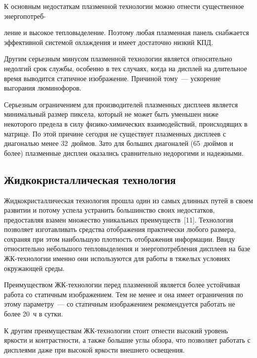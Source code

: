 \begin{multicols}{2}
     К основным недостаткам плазменной технологии можно отнести 
существенное энер\-го\-по\-треб-\linebreak\vspace*{-12pt}
\pagebreak

\noindent
ле\-ние и высокое тепловыделение. Поэтому любая 
плазменная панель снабжается эффективной системой охлаждения и имеет 
достаточно низкий КПД. 
     
     Другим серьезным минусом плазменной технологии является 
относительно недолгий срок службы, особенно в тех случаях, когда на 
дисплей на длительное время выводится статичное изображение. Причиной 
тому~--- ускорение выгорания люминофоров. 
     
     Серьезным ограничением для производителей плазменных дисплеев 
является минимальный размер пиксела, который не может быть уменьшен 
ниже некоторого предела в силу физико-химических взаимодействий, 
происходящих в матрице. По этой причине сегодня не существует 
плазменных дисплеев с диагональю менее 32~дюймов. Зато для больших 
диагоналей (65~дюймов и более) плазменные дисплеи оказались 
сравнительно недорогими и надежными.     

\subsection{Жидкокристаллическая технология} %

     Жидкокристаллическая технология прошла один из самых длинных 
путей в своем развитии и потому успела устранить большинство своих 
недостатков, предоставляя взамен множество уникальных преимуществ~[11]. 
Технология позволяет изготавливать средства отображения практически 
любого размера, сохраняя при этом наибольшую плотность отображения 
информации. Ввиду относительно небольшого тепловыделения и 
энер\-го\-по\-треб\-ле\-ния дисплеев на базе ЖК-тех\-но\-ло\-гии именно они 
используются для работы в тяжелых условиях окружающей среды. 
     
     Преимуществом ЖК-технологии перед плазменной является более 
устойчивая работа со статичным изображением. Тем не менее и она имеет 
ограничения по этому параметру~--- со статичным изображением 
рекомендуется работать не более 20~ч в сутки. 
     
     К другим преимуществам ЖК-технологии стоит отнести высокий 
уровень яркости и контраст\-ности, а также большие углы обзора, что 
позволяет работать с дисплеями даже при высокой яркости внешнего 
освещения. 
     

\end{multicols}
